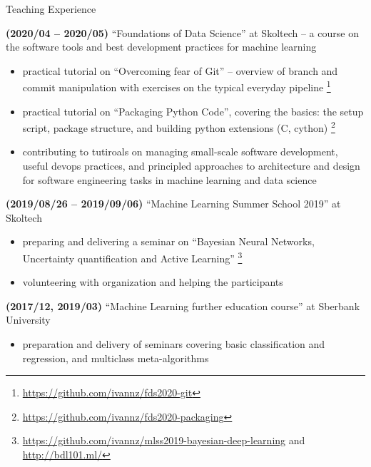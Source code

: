 \documentclass{resume} %
\begin{document}
\begin{rSection}{Teaching Experience}
    \item \textbf{(2020/04 -- 2020/05)}
    ``Foundations of Data Science'' at Skoltech -- a course on the software tools and best development practices for machine learning 
    \begin{itemize}
        \item practical tutorial on ``Overcoming fear of Git'' -- overview of branch and commit manipulation with exercises on the typical everyday pipeline%
        \footnote{
            \url{https://github.com/ivannz/fds2020-git}
        }

        \item practical tutorial on ``Packaging Python Code'', covering the basics: the setup script, package structure, and building python extensions (C, cython)%
        \footnote{
            \url{https://github.com/ivannz/fds2020-packaging}
        }

        \item contributing to tutiroals on managing small-scale software development, useful devops practices, and principled approaches to architecture and design for software engineering tasks in machine learning and data science
    \end{itemize}

    \item \textbf{(2019/08/26 -- 2019/09/06)}
    ``Machine Learning Summer School 2019'' at Skoltech
    \begin{itemize}
        \item preparing and delivering a seminar on ``Bayesian Neural Networks, Uncertainty quantification and Active Learning''%
        \footnote{
            \url{https://github.com/ivannz/mlss2019-bayesian-deep-learning}
            and \url{http://bdl101.ml/}
        }

        \item volunteering with organization and helping the participants
    \end{itemize}

    \item \textbf{(2017/12, 2019/03)}  %
    ``Machine Learning further education course'' at Sberbank University
    \begin{itemize}
        \item preparation and delivery of seminars covering basic classification and regression, and multiclass meta-algorithms
    \end{itemize}


\end{rSection}
\end{document}
